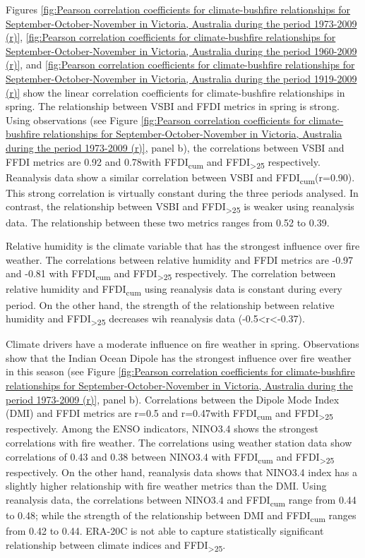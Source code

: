 Figures \ref{fig:Pearson correlation coefficients for climate-bushfire relationships for September-October-November in Victoria, Australia during the period 1973-2009 (r)},
\ref{fig:Pearson correlation coefficients for climate-bushfire relationships for September-October-November in Victoria, Australia during the period 1960-2009 (r)},
and \ref{fig:Pearson correlation coefficients for climate-bushfire relationships for September-October-November in Victoria, Australia during the period 1919-2009 (r)}
show the linear correlation coefficients for climate-bushfire relationships
in spring. The relationship between VSBI and FFDI metrics in spring
is strong. Using observations (see Figure \ref{fig:Pearson correlation coefficients for climate-bushfire relationships for September-October-November in Victoria, Australia during the period 1973-2009 (r)},
panel b), the correlations between VSBI and FFDI metrics are 0.92
and 0.78\textemdash with FFDI\textsubscript{cum} and FFDI\textsubscript{>25}
respectively\textemdash . Reanalysis data show a similar correlation
between VSBI and FFDI\textsubscript{cum}(r=0.90). This strong correlation
is virtually constant during the three periods analysed. In contrast,
the relationship between VSBI and FFDI\textsubscript{>25} is weaker
using reanalysis data. The relationship between these two metrics
ranges from 0.52 to 0.39.

Relative humidity is the climate variable that has the strongest influence
over fire weather. The correlations between relative humidity and
FFDI metrics are -0.97 and -0.81 with FFDI\textsubscript{cum} and
FFDI\textsubscript{>25} respectively\textemdash . The correlation
between relative humidity and FFDI\textsubscript{cum} using reanalysis
data is constant during every period. On the other hand, the strength
of the relationship between relative humidity and FFDI\textsubscript{>25}
decreases wih reanalysis data (-0.5<r<-0.37). 

Climate drivers have a moderate influence on fire weather in spring.
Observations show that the Indian Ocean Dipole has the strongest influence
over fire weather in this season (see Figure \ref{fig:Pearson correlation coefficients for climate-bushfire relationships for September-October-November in Victoria, Australia during the period 1973-2009 (r)},
panel b). Correlations between the Dipole Mode Index (DMI) and FFDI
metrics are r=0.5 and r=0.47\textemdash with FFDI\textsubscript{cum}
and FFDI\textsubscript{>25} respectively\textemdash . Among the ENSO
indicators, NINO3.4 shows the strongest correlations with fire weather\textemdash .
The correlations using weather station data show correlations of 0.43
and 0.38 between NINO3.4 with FFDI\textsubscript{cum} and FFDI\textsubscript{>25}
respectively. On the other hand, reanalysis data shows that NINO3.4
index has a slightly higher relationship with fire weather metrics
than the DMI. Using reanalysis data, the correlations between NINO3.4
and FFDI\textsubscript{cum  }range from 0.44 to 0.48; while the strength
of the relationship between DMI and FFDI\textsubscript{cum }ranges
from 0.42 to 0.44. ERA-20C is not able to capture statistically significant
relationship between climate indices and FFDI\textsubscript{>25}. 

